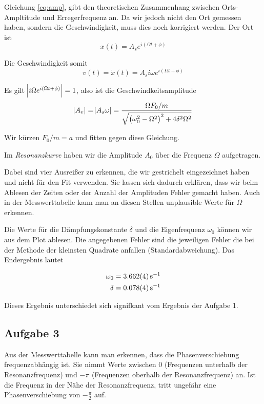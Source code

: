 \documentclass[a4paper,german,12pt,smallheadings]{scrartcl}
\begin{document}
\vspace{1cm}

Gleichung \ref{eq:amp}, gibt den theoretischen Zusammenhang zwischen
Orts-Ampltitude und Erregerfrequenz an. Da wir jedoch nicht den Ort gemessen
haben, sondern die Geschwindigkeit, muss dies noch korrigiert werden. Der Ort
ist
\begin{equation}
  x(t) = A_s e^{i(\Omega t + \phi)}
\end{equation}

Die Geschwindigkeit somit
\begin{equation}
  v(t) = \dot{x}(t) = A_s i \omega e^{i(\Omega t + \phi)}
\end{equation}

Es gilt $\envert{i \Omega e^{i(\Omega t + \phi)}} = 1$, also ist die
Geschwindkeitsamplitude
\begin{equation}
  \envert{A_v} = \envert{A_s \omega} = \frac{\Omega F_0 / m}{\sqrt{\del{\omega_0^2 - \Omega^2}^2 + 4 \delta^2 \Omega^2}}
\end{equation}

Wir kürzen $F_0 / m = a$ und fitten gegen diese Gleichung.

Im \textit{Resonanzkurve} haben wir die Amplitude $A_0$ über die Frequenz
$\Omega$ aufgetragen.

Dabei sind vier Ausreißer zu erkennen, die wir gestrichelt eingezeichnet haben
und nicht für den Fit verwenden. Sie lassen sich dadurch erklären, dass wir
beim Ablesen der Zeiten oder der Anzahl der Amplituden Fehler gemacht haben.
Auch in der Messwerttabelle kann man an diesen Stellen unplausible Werte für
$\Omega$ erkennen.

Die Werte für die Dämpfungskonstante $\delta$ und die Eigenfrequenz $\omega_0$
können wir aus dem Plot ablesen.  Die angegebenen Fehler sind die jeweiligen
Fehler die bei der Methode der kleinsten Quadrate anfallen
(Standardabweichung). Das Endergebnis lautet

\begin{align}
  \omega_0 &= \SI{3.662+-0.004}{s^{-1}} \\
  \delta &= \SI{0.078+-0.004}{s^{-1}}
\end{align}

Dieses Ergebnis unterschiedet sich signifkant vom Ergebnis der Aufgabe 1.

\subsection{Aufgabe 3}
Aus der Messwerttabelle kann man erkennen, dass die Phasenverschiebung
frequenzabhängig ist. Sie nimmt Werte zwischen $0$ (Frequenzen unterhalb der
Resonanzfrequenz) und $-\pi$ (Frequenzen oberhalb der Resonanzfrequenz) an. Ist
die Frequenz in der Nähe der Resonanzfrequenz, tritt ungefähr eine
Phasenverschiebung von $-\frac{\pi}{2}$ auf.
\end{document}
